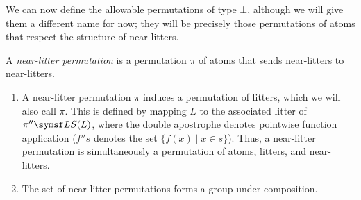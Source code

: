 We can now define the allowable permutations of type \( \bot \), although we will give them a different name for now; they will be precisely those permutations of atoms that respect the structure of near-litters.
\begin{definition}
    A \emph{near-litter permutation} is a permutation \( \pi \) of atoms that sends near-litters to near-litters.
\end{definition}
\begin{remarks}
    \begin{enumerate}
        \item A near-litter permutation \( \pi \) induces a permutation of litters, which we will also call \( \pi \).
        This is defined by mapping \( L \) to the associated litter of \( \pi '' \LS(L) \), where the double apostrophe denotes pointwise function application (\( f '' s \) denotes the set \( \{ f(x) \mid x \in s \} \)).
        Thus, a near-litter permutation is simultaneously a permutation of atoms, litters, and near-litters.
        \item The set of near-litter permutations forms a group under composition.
    \end{enumerate}
\end{remarks}
